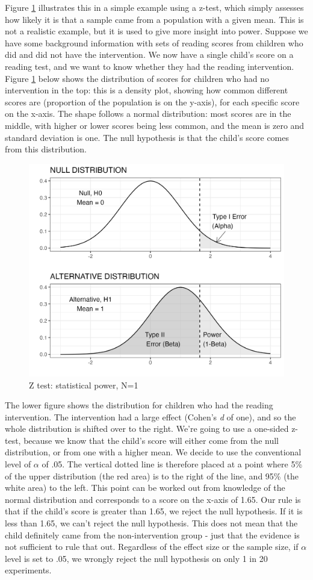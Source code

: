 \documentclass{krantz}
\begin{document}
Figure \ref{fig:densplot} illustrates this in a simple example using a z-test, which simply assesses how likely it is that a sample came from a population with a given mean. This is not a realistic example, but it is used to give more insight into power. Suppose we have some background information with sets of reading scores from children who did and did not have the intervention. We now have a single child's score on a reading test, and we want to know whether they had the reading intervention. Figure \ref{fig:densplot} below shows the distribution of scores for children who had no intervention in the top: this is a density plot, showing how common different scores are (proportion of the population is on the y-axis), for each specific score on the x-axis. The shape follows a normal distribution: most scores are in the middle, with higher or lower scores being less common, and the mean is zero and standard deviation is one. The null hypothesis is that the child's score comes from this distribution.

\begin{center}
\begin{figure}
\includegraphics[width=0.5\linewidth]{images_bw/densplot1} \caption{Z test: statistical power, N=1}\label{fig:densplot}
\end{figure}
\end{center}

The lower figure shows the distribution for children who had the reading intervention. The intervention had a large effect (Cohen's \emph{d} of one), and so the whole distribution is shifted over to the right. We're going to use a one-sided z-test, because we know that the child's score will either come from the null distribution, or from one with a higher mean. We decide to use the conventional level of \(\alpha\) of .05. The vertical dotted line is therefore placed at a point where 5\% of the upper distribution (the red area) is to the right of the line, and 95\% (the white area) to the left. This point can be worked out from knowledge of the normal distribution and corresponds to a score on the x-axis of 1.65. Our rule is that if the child's score is greater than 1.65, we reject the null hypothesis. If it is less than 1.65, we can't reject the null hypothesis. This does not mean that the child definitely came from the non-intervention group - just that the evidence is not sufficient to rule that out. Regardless of the effect size or the sample size, if \(\alpha\) level is set to .05, we wrongly reject the null hypothesis on only 1 in 20 experiments.
\end{document}
